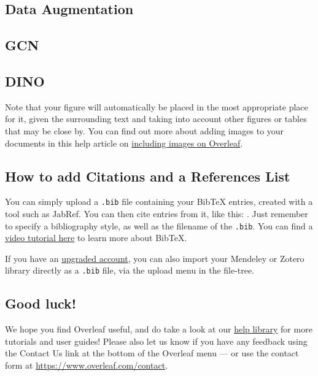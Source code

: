 \documentclass{article}
\begin{document}
\subsection{Data Augmentation}

\subsection{GCN}

\subsection{DINO}


Note that your figure will automatically be placed in the most appropriate place for it, given the surrounding text and taking into account other figures or tables that may be close by. You can find out more about adding images to your documents in this help article on \href{https://www.overleaf.com/learn/how-to/Including_images_on_Overleaf}{including images on Overleaf}.


\subsection{How to add Citations and a References List}

You can simply upload a \verb|.bib| file containing your BibTeX entries, created with a tool such as JabRef. You can then cite entries from it, like this: \cite{greenwade93}. Just remember to specify a bibliography style, as well as the filename of the \verb|.bib|. You can find a \href{https://www.overleaf.com/help/97-how-to-include-a-bibliography-using-bibtex}{video tutorial here} to learn more about BibTeX.

If you have an \href{https://www.overleaf.com/user/subscription/plans}{upgraded account}, you can also import your Mendeley or Zotero library directly as a \verb|.bib| file, via the upload menu in the file-tree.

\subsection{Good luck!}

We hope you find Overleaf useful, and do take a look at our \href{https://www.overleaf.com/learn}{help library} for more tutorials and user guides! Please also let us know if you have any feedback using the Contact Us link at the bottom of the Overleaf menu --- or use the contact form at \url{https://www.overleaf.com/contact}.



\end{document}
